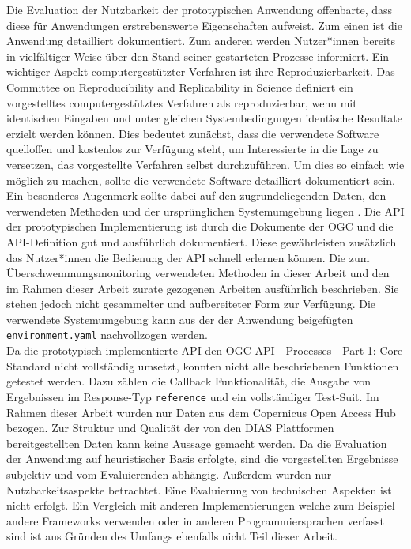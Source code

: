 Die Evaluation der Nutzbarkeit der prototypischen Anwendung offenbarte, dass diese für Anwendungen erstrebenswerte Eigenschaften aufweist. Zum einen ist die 
Anwendung detailliert dokumentiert. Zum anderen werden Nutzer*innen bereits in vielfältiger Weise über den Stand seiner gestarteten Prozesse informiert. 
Ein wichtiger Aspekt computergestützter Verfahren ist ihre Reproduzierbarkeit. Das Committee on Reproducibility and Replicability in Science definiert 
ein vorgestelltes computergestütztes Verfahren als reproduzierbar, wenn mit identischen Eingaben und unter gleichen Systembedingungen identische Resultate erzielt werden können.  
Dies bedeutet zunächst, dass die verwendete Software quelloffen und kostenlos zur Verfügung steht, um Interessierte in die Lage zu versetzen, das vorgestellte Verfahren
selbst durchzuführen. Um dies so einfach wie möglich zu machen, sollte die verwendete Software detailliert dokumentiert sein. Ein besonderes Augenmerk sollte dabei auf den 
zugrundeliegenden Daten, den verwendeten Methoden und der ursprünglichen Systemumgebung liegen \cite{reproducibility}.
Die API der prototypischen Implementierung ist durch die Dokumente der OGC und die API-Definition gut und ausführlich dokumentiert. Diese gewährleisten zusätzlich das Nutzer*innen 
die Bedienung der API schnell erlernen können. 
Die zum Überschwemmungsmonitoring verwendeten Methoden in dieser Arbeit und den im Rahmen dieser Arbeit zurate gezogenen Arbeiten ausführlich beschrieben. Sie stehen jedoch nicht 
gesammelter und aufbereiteter Form  zur Verfügung. Die verwendete Systemumgebung kann aus der 
der Anwendung beigefügten \verb|environment.yaml| nachvollzogen werden. \\

Da die prototypisch implementierte API den OGC API - Processes - Part 1: Core Standard nicht vollständig umsetzt, konnten nicht alle beschriebenen 
Funktionen getestet werden. Dazu zählen die Callback Funktionalität, die Ausgabe von Ergebnissen im Response-Typ \verb|reference| und ein 
vollständiger Test-Suit.
Im Rahmen dieser Arbeit wurden nur Daten aus dem Copernicus Open Access Hub bezogen. Zur Struktur und Qualität der von den DIAS Plattformen 
bereitgestellten Daten kann keine Aussage gemacht werden. 
Da die Evaluation der Anwendung auf heuristischer Basis erfolgte, sind die vorgestellten Ergebnisse subjektiv und vom Evaluierenden abhängig. Außerdem 
wurden nur Nutzbarkeitsaspekte betrachtet. Eine Evaluierung von technischen Aspekten ist nicht erfolgt. 
Ein Vergleich mit anderen Implementierungen welche zum Beispiel andere Frameworks verwenden oder in anderen Programmiersprachen verfasst sind ist aus 
Gründen des Umfangs ebenfalls nicht Teil dieser Arbeit. 

